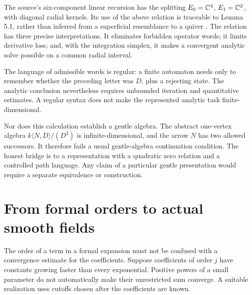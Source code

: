 The source's six-component linear recursion has the splitting
$E_0=\mathbb{C}^4$, $E_1=\mathbb{C}^2$, with diagonal radial kernels. Its use of the
above relation is traceable to Lemma 5.1, rather than inferred from a
superficial resemblance to a quiver \citep{NSOpenAI2026}. The relation
has three precise interpretations. It eliminates forbidden operator words;
it limits derivative loss; and, with the integration simplex, it makes a
convergent analytic solve possible on a common radial interval.

The language of admissible words is regular: a finite automaton needs only
to remember whether the preceding letter was $D$, plus a rejecting state.
The analytic conclusion nevertheless requires unbounded iteration and
quantitative estimates. A regular syntax does not make the represented
analytic task finite-dimensional.

Nor does this calculation establish a gentle algebra. The abstract
one-vertex algebra $k\langle N,D\rangle/(D^2)$ is infinite-dimensional,
and the arrow $N$ has two allowed successors. It therefore fails a usual
gentle-algebra continuation condition. The honest bridge is to a
representation with a quadratic zero relation and a controlled path
language. Any claim of a particular gentle presentation would require
a separate equivalence or construction.

\section{From formal orders to actual smooth fields}

The order of a term in a formal expansion must not be confused with a
convergence estimate for the coefficients. Suppose coefficients of order
$j$ have constants growing faster than every exponential. Positive powers
of a small parameter do not automatically make their unrestricted sum
converge. A suitable realization uses cutoffs chosen after the coefficients
are known.

